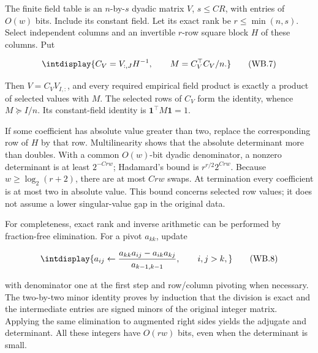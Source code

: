 \mbox{}\par\smallskip


The finite field table is an \(n\)-by-\(s\) dyadic matrix \(V\), \(s\le CR\), with entries of \(O(w)\) bits. Include its constant field. Let its exact rank be \(r\le\min(n,\allowbreak s)\). Select independent columns and an invertible \(r\)-row square block \(H\) of these columns. Put


\begingroup\renewcommand{\theHequation}{intdisplay.787}
\begin{equation}
\intdisplay{
C_V=V_{:,J}H^{-1},\qquad M=C_V^\top C_V/n.
}
\tag{WB.7}
\label{int:eq-0379-wb-7}
\end{equation}
\endgroup


Then \(V=C_VV_{I,\allowbreak :}\), and every required empirical field product is exactly a product of selected values with \(M\). The selected rows of \(C_V\) form the identity, whence \(M\succeq I/n\). Its constant-field identity is \(\mathbf1^\top M\mathbf1=1\).



If some coefficient has absolute value greater than two, replace the corresponding row of \(H\) by that row. Multilinearity shows that the absolute determinant more than doubles. With a common \(O(w)\)-bit dyadic denominator, a nonzero determinant is at least \(2^{-Crw}\); Hadamard's bound is \(r^{r/2}2^{Crw}\). Because \(w\ge\log_2(r+2)\), there are at most \(Crw\) swaps. At termination every coefficient is at most two in absolute value. This bound concerns selected row values; it does not assume a lower singular-value gap in the original data.



For completeness, exact rank and inverse arithmetic can be performed by fraction-free elimination. For a pivot \(a_{kk}\), update


\begingroup\renewcommand{\theHequation}{intdisplay.788}
\begin{equation}
\intdisplay{
a_{ij}\leftarrow
\frac{a_{kk}a_{ij}-a_{ik}a_{kj}}{a_{k-1,k-1}},
\qquad i,j>k,
}
\tag{WB.8}
\label{int:eq-0380-wb-8}
\end{equation}
\endgroup


with denominator one at the first step and row/column pivoting when necessary. The two-by-two minor identity proves by induction that the division is exact and the intermediate entries are signed minors of the original integer matrix. Applying the same elimination to augmented right sides yields the adjugate and determinant. All these integers have \(O(rw)\) bits, even when the determinant is small.


